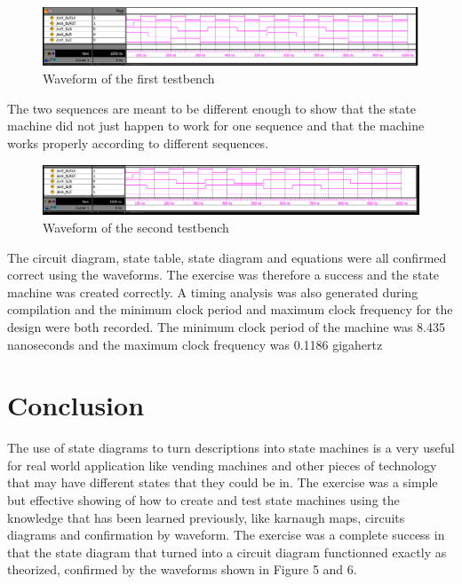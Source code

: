 \documentclass[CMPE]{KGCOEReport}
\begin{document}
\begin{figure}[H]
	\centering
	\includegraphics[width=\textwidth]{ModelSimL9}
	\caption{Waveform of the first testbench}
	\label{fig:Figure 5}
\end{figure}

The two sequences are meant to be different enough to show that the state machine did not just happen to work for one sequence and that the machine works properly according to different sequences.

\begin{figure}[H]
	\centering
	\includegraphics[width=\textwidth]{ModelSimL9PT1}
	\caption{Waveform of the second testbench}
	\label{fig:Figure 6}
\end{figure}

The circuit diagram, state table, state diagram and equations were all confirmed correct using the waveforms. The exercise was therefore a success and the state machine was created correctly.
A timing analysis was also generated during compilation and the minimum clock period and maximum clock frequency for the design were both recorded. The minimum clock period of the machine was  8.435 nanoseconds and the maximum clock frequency was 0.1186 gigahertz

\section*{Conclusion}
The use of state diagrams to turn descriptions into state machines is a very useful for real world application like vending machines and other pieces of technology that may have different states that they could be in. The exercise was a simple but effective showing of how to create and test state machines using the knowledge that has been learned previously, like karnaugh maps, circuits diagrams and confirmation by waveform. The exercise was a complete success in that the state diagram that turned into a circuit diagram functionned exactly as theorized, confirmed by the waveforms shown in Figure 5 and 6. 
\bigskip
\bigskip
\bigskip
\bigskip
\bigskip
\bigskip
\bigskip
\end{document}
